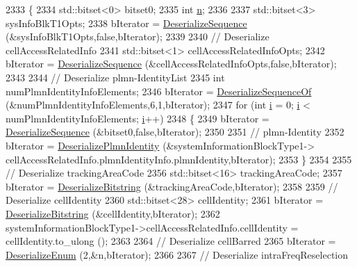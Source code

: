 \begin{DoxyCode}
2333 \{
2334   std::bitset<0> bitset0;
2335   \textcolor{keywordtype}{int} \hyperlink{namespacesample-rng-plot_aeb5ee5c431e338ef39b7ac5431242e1d}{n};
2336 
2337   std::bitset<3> sysInfoBlkT1Opts;
2338   bIterator = \hyperlink{classns3_1_1Asn1Header_a58c68bb97ba3fe2e8fcdd7c208d672b2}{DeserializeSequence} (&sysInfoBlkT1Opts,\textcolor{keyword}{false},bIterator);
2339 
2340   \textcolor{comment}{// Deserialize cellAccessRelatedInfo}
2341   std::bitset<1> cellAccessRelatedInfoOpts;
2342   bIterator = \hyperlink{classns3_1_1Asn1Header_a58c68bb97ba3fe2e8fcdd7c208d672b2}{DeserializeSequence} (&cellAccessRelatedInfoOpts,\textcolor{keyword}{false},bIterator);
2343 
2344   \textcolor{comment}{// Deserialize plmn-IdentityList}
2345   \textcolor{keywordtype}{int} numPlmnIdentityInfoElements;
2346   bIterator = \hyperlink{classns3_1_1Asn1Header_a1a7245e05b482df8abade0a060bd0ecc}{DeserializeSequenceOf} (&numPlmnIdentityInfoElements,6,1,bIterator);
2347   \textcolor{keywordflow}{for} (\textcolor{keywordtype}{int} \hyperlink{bernuolliDistribution_8m_a6f6ccfcf58b31cb6412107d9d5281426}{i} = 0; \hyperlink{bernuolliDistribution_8m_a6f6ccfcf58b31cb6412107d9d5281426}{i} < numPlmnIdentityInfoElements; \hyperlink{bernuolliDistribution_8m_a6f6ccfcf58b31cb6412107d9d5281426}{i}++)
2348     \{
2349       bIterator = \hyperlink{classns3_1_1Asn1Header_a58c68bb97ba3fe2e8fcdd7c208d672b2}{DeserializeSequence} (&bitset0,\textcolor{keyword}{false},bIterator);
2350 
2351       \textcolor{comment}{// plmn-Identity}
2352       bIterator = \hyperlink{classns3_1_1RrcAsn1Header_a50855ae1c2fda4b56c194497755971d6}{DeserializePlmnIdentity} (&systemInformationBlockType1->
      cellAccessRelatedInfo.plmnIdentityInfo.plmnIdentity,bIterator);
2353     \}
2354 
2355   \textcolor{comment}{// Deserialize trackingAreaCode}
2356   std::bitset<16> trackingAreaCode;
2357   bIterator = \hyperlink{classns3_1_1Asn1Header_adb34498b05e8562fba5d40f49578968d}{DeserializeBitstring} (&trackingAreaCode,bIterator);
2358 
2359   \textcolor{comment}{// Deserialize cellIdentity}
2360   std::bitset<28> cellIdentity;
2361   bIterator = \hyperlink{classns3_1_1Asn1Header_adb34498b05e8562fba5d40f49578968d}{DeserializeBitstring} (&cellIdentity,bIterator);
2362   systemInformationBlockType1->cellAccessRelatedInfo.cellIdentity = cellIdentity.to\_ulong ();
2363 
2364   \textcolor{comment}{// Deserialize cellBarred}
2365   bIterator = \hyperlink{classns3_1_1Asn1Header_a4fcc253e0eec3483c775b005c1875f2d}{DeserializeEnum} (2,&n,bIterator);
2366 
2367   \textcolor{comment}{// Deserialize intraFreqReselection}

\end{DoxyCode}
